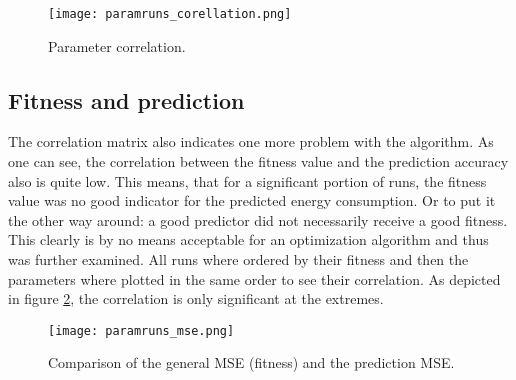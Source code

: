 \documentclass[conference]{IEEEtran}
\begin{document}
\begin{figure}[!t] 
\centering 
\texttt{[image: paramruns\_corellation.png]} 
\caption{Parameter correlation.} 
\label{fig:param_correlation} 
\end{figure}


\subsection{Fitness and prediction}
\label{sec:fitness_prediction}
The correlation matrix also indicates one more problem with the algorithm. As one can see, the correlation between the fitness value and the prediction accuracy also is quite low. This means, that for a significant portion of runs, the fitness value was no good indicator for the predicted energy consumption. Or to put it the other way around: a good predictor did not necessarily receive a good fitness.\\
This clearly is by no means acceptable for an optimization algorithm and thus was further examined. All runs where ordered by their fitness and then the parameters where plotted in the same order to see their correlation. As depicted in figure \ref{fig:mse_comparison}, the correlation is only significant at the extremes.

\begin{figure}[!t] 
\centering 
\texttt{[image: paramruns\_mse.png]} 
\caption{Comparison of the general MSE (fitness) and the prediction MSE.} 
\label{fig:mse_comparison} 
\end{figure}
\end{document}
